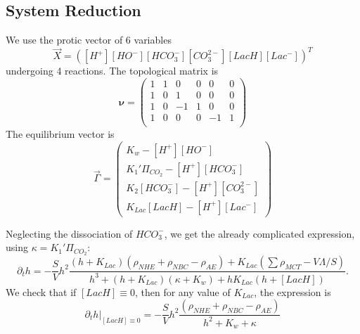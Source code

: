 \documentclass{revtex4}
\begin{document}
\subsection{System Reduction}
We use the protic vector of 6 variables
\begin{equation}
	\vec{X} = \left( \left[H^+\right]  \left[HO^-\right] \left[HCO_3^-\right] \left[CO_3^{2-}\right] \left[LacH\right]  \left[Lac^-\right] \right)^T
\end{equation}
undergoing 4 reactions.
The topological matrix is
\begin{equation}
	\boldsymbol{\nu} =
	\begin{pmatrix}
	1 & 1 & 0 & 0 & 0 & 0\\
	1 & 0 & 1 & 0 & 0 & 0\\
	1 & 0 & -1 & 1 & 0 & 0\\
	1 & 0 & 0 & 0  & -1 & 1\\
	\end{pmatrix}
\end{equation}
The equilibrium vector is
\begin{equation}
	\vec{\Gamma} =
	 \begin{pmatrix}
	K_w - \left[H^+\right]  \left[HO^-\right]\\
	K_1'\Pi_{CO_2} - \left[H^+\right]\left[HCO_3^-\right]\\
	K_2 {\left[HCO_3^-\right]} -\left[H^+\right]\left[CO_3^{2-}\right]\\
	K_{Lac}\left[LacH\right] - \left[H^+\right]\left[Lac^-\right]
	\end{pmatrix}
\end{equation}

Neglecting the dissociation of $HCO_3^-$, we get the already complicated expression, using $\kappa = K_1'\Pi_{CO_2}$:
\begin{equation}
\partial_t h = - \dfrac{S}{V} h^2
\dfrac{\left(h+K_{Lac}\right)\left(\rho_{NHE}+\rho_{NBC}-\rho_{AE}\right)+K_{Lac}\left(\sum \rho_{MCT}-V\Lambda/S\right)}
{h^3+(h+K_{Lac})\left(\kappa+K_w\right)+h K_{Lac}\left(h+\left[LacH\right]\right)}.
\end{equation}
We check that if $\left[LacH\right]\equiv0$, then for any value of $K_{Lac}$, the expression is
$$
	\partial_t h\vert_{\left[LacH\right]\equiv0} = 
	-\dfrac{S}{V} h^2
	\dfrac{\left(\rho_{NHE}+\rho_{NBC}-\rho_{AE}\right)}{h^2+K_w+\kappa}
$$
\end{document}
